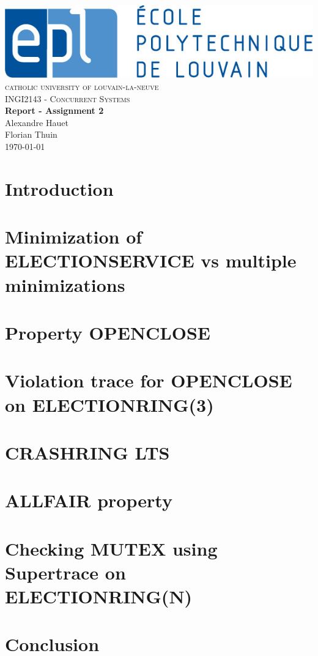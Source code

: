 \documentclass[fleqn]{article}
\begin{document}
\begin{titlepage}
	\begin{center}
		\includegraphics[scale=0.4]{epl-logo.jpg} \\[1.5cm]
		\textsc{\LARGE catholic university of louvain-la-neuve} \\[0.5cm]
		\textsc{\Large INGI2143 - Concurrent Systems}\\[2cm]
    		{ \huge \bfseries Report - Assignment 2\\[0.4cm] }
		{\large Alexandre Hauet \\ [0.1cm]Florian Thuin}\\[2cm]
		{\large \today}
	\end{center}
\end{titlepage}

\section{Introduction}



\section{Minimization of ELECTIONSERVICE vs multiple minimizations}



\newpage
\section{Property OPENCLOSE}



\section{Violation trace for OPENCLOSE on ELECTIONRING(3)}



\section{CRASHRING LTS}



\section{ALLFAIR property}





\section{Checking MUTEX using Supertrace on ELECTIONRING(N)}


\section{Conclusion}

\end{document}

